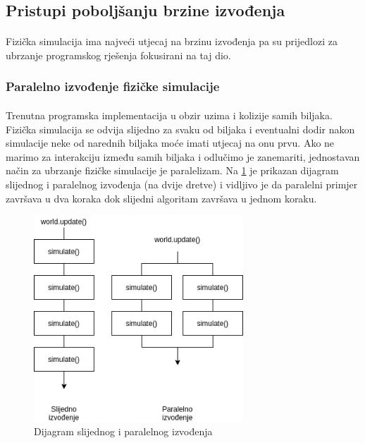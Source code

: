 \documentclass[times, utf8, diplomski]{fer}
\begin{document}
\subsection{Pristupi poboljšanju brzine izvođenja}
\paragraph{}
Fizička simulacija ima najveći utjecaj na brzinu izvođenja pa su prijedlozi za 
ubrzanje programskog rješenja fokusirani na taj dio.
\subsubsection{Paralelno izvođenje fizičke simulacije}
\paragraph{}
Trenutna programska implementacija u obzir uzima i kolizije samih biljaka. 
Fizička simulacija se odvija slijedno za svaku od biljaka i eventualni dodir 
nakon simulacije neke od narednih biljaka moće imati utjecaj na onu prvu. Ako
ne marimo za interakciju između samih biljaka i odlučimo je zanemariti, 
jednostavan način za ubrzanje fizičke simulacije je paralelizam. Na \ref{fig:531-1} je prikazan dijagram slijednog i paralelnog izvođenja (na dvije dretve) i vidljivo je da paralelni primjer završava u dva koraka dok slijedni algoritam završava u jednom koraku.

\begin{figure}[h]
	\centering
	\includegraphics[width=0.7\textwidth]{img/531-1}
	\caption{Dijagram slijednog i paralelnog izvođenja}
	\label{fig:531-1}
\end{figure}
\end{document}
